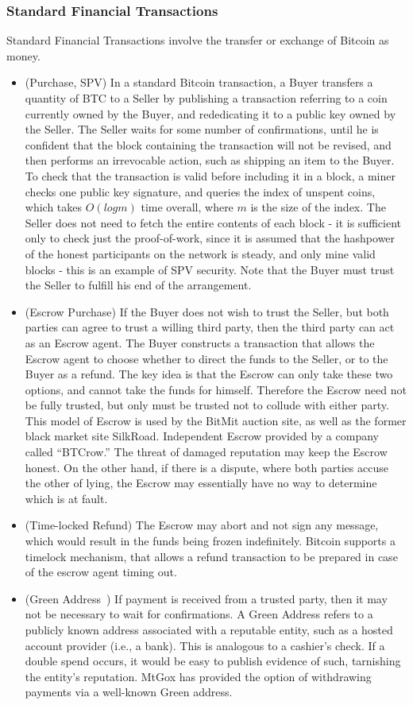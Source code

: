 \subsubsection{Standard Financial Transactions}
Standard Financial Transactions involve the transfer or exchange of Bitcoin as money.
\begin{itemize}
\item (Purchase, SPV) In a standard Bitcoin transaction, a Buyer transfers a quantity of BTC to a Seller by publishing a transaction referring to a coin currently owned by the Buyer, and rededicating it to a public key owned by the Seller. The Seller waits for some number of confirmations, until he is confident that the block containing the transaction will not be revised, and then performs an irrevocable action, such as shipping an item to the Buyer. To check that the transaction is valid before including it in a block, a miner checks one public key signature, and queries the index of unspent coins, which takes $O(log m)$ time overall, where $m$ is the size of the index. The Seller does not need to fetch the entire contents of each block - it is sufficient only to check just the proof-of-work, since it is assumed that the hashpower of the honest participants on the network is steady, and only mine valid blocks - this is an example of SPV security. Note that the Buyer must trust the Seller to fulfill his end of the arrangement.

\item (Escrow Purchase) If the Buyer does not wish to trust the Seller, but both parties can agree to trust a willing third party, then the third party can act as an Escrow agent. The Buyer constructs a transaction that allows the Escrow agent to choose whether to direct the funds to the Seller, or to the Buyer as a refund. The key idea is that the Escrow can only take these two options, and cannot take the funds for himself. Therefore the Escrow need not be fully trusted, but only must be trusted not to collude with either party. This model of Escrow is used by the BitMit auction site, as well as the former black market site SilkRoad. Independent Escrow provided by a company called ``BTCrow.'' The threat of damaged reputation may keep the Escrow honest. On the other hand, if there is a dispute, where both parties accuse the other of lying, the Escrow may essentially have no way to determine which is at fault.

\item (Time-locked Refund) The Escrow may abort and not sign any message, which would result in the funds being frozen indefinitely. Bitcoin supports a timelock mechanism, that allows a refund transaction to be prepared in case of the escrow agent timing out.
\item (Green Address~\cite{greenaddress}) If payment is received from a trusted party, then it may not be necessary to wait for confirmations. A Green Address refers to a publicly known address associated with a reputable entity, such as a hosted account provider (i.e., a bank). This is analogous to a cashier's check. If a double spend occurs, it would be easy to publish evidence of such, tarnishing the entity's reputation. MtGox has provided the option of withdrawing payments via a well-known Green address.


\end{itemize}
